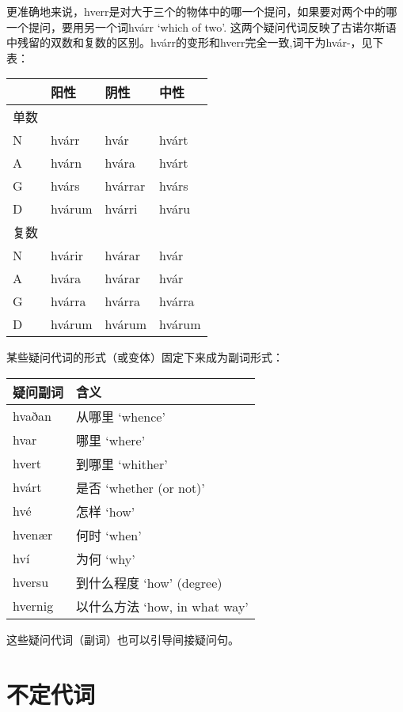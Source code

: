 更准确地来说，hverr是对大于三个的物体中的哪一个提问，如果要对两个中的哪一个提问，要用另一个词hvárr
`which of two‌'.
这两个疑问代词反映了古诺尔斯语中残留的双数和复数的区别。hvárr的变形和hverr完全一致,词干为hvár-，见下表：

\begin{longtable}{llll}
  \toprule
     & 阳性     & 阴性      & 中性     \\
  \midrule
  \endhead
  \bottomrule
  \endfoot
  单数 &        &         &        \\
  N  & hvárr  & hvár    & hvárt  \\
  A  & hvárn  & hvára   & hvárt  \\
  G  & hvárs  & hvárrar & hvárs  \\
  D  & hvárum & hvárri  & hváru  \\
  复数 &        &         &        \\
  N  & hvárir & hvárar  & hvár   \\
  A  & hvára  & hvárar  & hvár   \\
  G  & hvárra & hvárra  & hvárra \\
  D  & hvárum & hvárum  & hvárum \\
\end{longtable}

某些疑问代词的形式（或变体）固定下来成为副词形式：

\begin{longtable}{ll}
  \toprule
  疑问副词    & 含义                       \\
  \midrule
  \endhead
  \bottomrule
  \endfoot
  hvaðan  & 从哪里 `whence‌'             \\
  hvar    & 哪里 `where‌'               \\
  hvert   & 到哪里 `whither‌'            \\
  hvárt   & 是否 `whether (or not)‌'    \\
  hvé     & 怎样 `how‌'                 \\
  hvenær  & 何时 `when‌'                \\
  hví     & 为何 `why‌'                 \\
  hversu  & 到什么程度 `how‌' (degree)     \\
  hvernig & 以什么方法 `how, in what way‌' \\
\end{longtable}

这些疑问代词（副词）也可以引导间接疑问句。

\section{不定代词}\label{不定代词}

